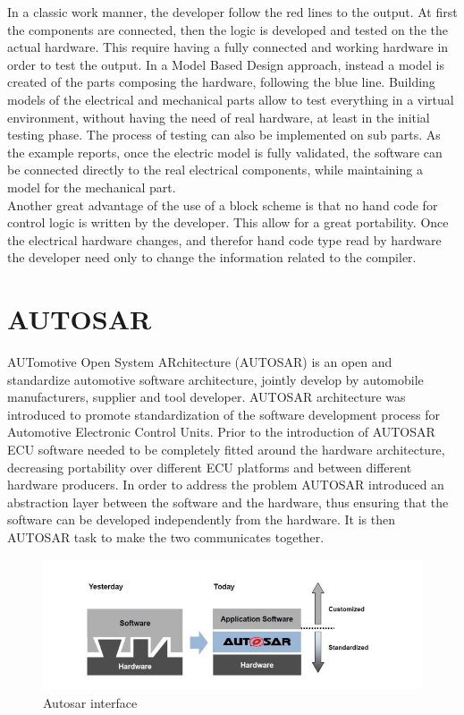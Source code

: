 \documentclass[../main.tex]{subfiles}
\begin{document}
In a classic work manner, the developer follow the red lines to the output. At first the components are connected, then the logic is developed and tested on the the actual hardware. This require having a fully connected and working hardware in order to test the output. In a Model Based Design approach, instead a model is created of the parts composing the hardware, following the blue line. Building models of the electrical and mechanical parts allow to test everything in a virtual environment, without having the need of real hardware, at least in the initial testing phase. The process of testing can also be implemented on sub parts. As the example reports, once the electric model is fully validated, the software can be connected directly to the real electrical components, while maintaining a model for the mechanical part.\\
Another great advantage of the use of a block scheme is that no hand code for control logic is written by the developer. This allow for a great portability. Once the electrical hardware changes, and therefor hand code type read by hardware the developer need only to change the information related to the compiler. 
\section{AUTOSAR}
\label{sec:AUTOSAR}
AUTomotive Open System ARchitecture (\gls{AUTOSAR}) is an open and standardize automotive software architecture, jointly develop by automobile manufacturers, supplier and tool developer. \gls{AUTOSAR} architecture was introduced to promote standardization of the software development process for Automotive Electronic Control Units. Prior to the introduction of \gls{AUTOSAR} \gls{ECU} software needed to be completely fitted around the hardware architecture, decreasing portability over different \gls{ECU} platforms and between different hardware producers. 
In order to address the problem \gls{AUTOSAR} introduced an abstraction layer between the software and the hardware, thus ensuring that the software can be developed independently from the hardware. It is then \gls{AUTOSAR} task to make the two communicates together.
\begin{figure}[h]
    \centering
    \includegraphics[width=\linewidth]{images_folder/autosarcapture.jpg}
    \caption{Autosar interface}
    \label{fig:AUTCA}
\end{figure}
\end{document}
